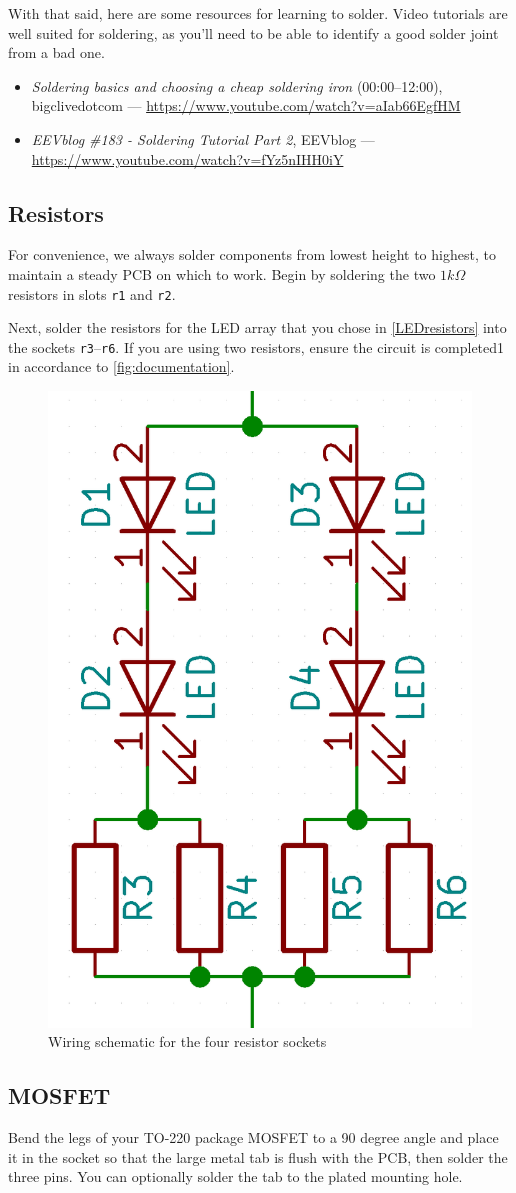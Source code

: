 \documentclass[10pt, a4paper, onesided]{article}
\begin{document}
		With that said, here are some resources for learning to solder. Video tutorials are well suited for soldering, as you'll need to be able to identify a good solder joint from a bad one.
		\begin{itemize}[nolistsep]
			\item \textit{Soldering basics and choosing a cheap soldering iron} (00:00--12:00), bigclivedotcom --- \url{https://www.youtube.com/watch?v=aIab66EgfHM}
			\item \textit{EEVblog \#183 - Soldering Tutorial Part 2}, EEVblog --- \url{https://www.youtube.com/watch?v=fYz5nIHH0iY}
		\end{itemize}
	
	\subsection*{Resistors}
	
		For convenience, we always solder components from lowest height to highest, to maintain a steady PCB on which to work. Begin by soldering the two $1 k\Omega$ resistors in slots \texttt{r1} and \texttt{r2}.
		
		Next, solder the resistors for the LED array that you chose in \autoref{LEDresistors} into the sockets \texttt{r3}--\texttt{r6}. If you are using two resistors, ensure the circuit is completed1 in accordance to \autoref*{fig:documentation}.
		
		\begin{figure}[h]
			\centering
			\includegraphics[width=0.25\linewidth]{img/resistor}
			\caption{Wiring schematic for the four resistor sockets}
			\label{fig:documentation}
		\end{figure}
	
	\subsection*{MOSFET}
	
		Bend the legs of your TO-220 package MOSFET to a 90 degree angle and place it in the socket so that the large metal tab is flush with the PCB, then solder the three pins. You can optionally solder the tab to the plated mounting hole.
		
\end{document}
